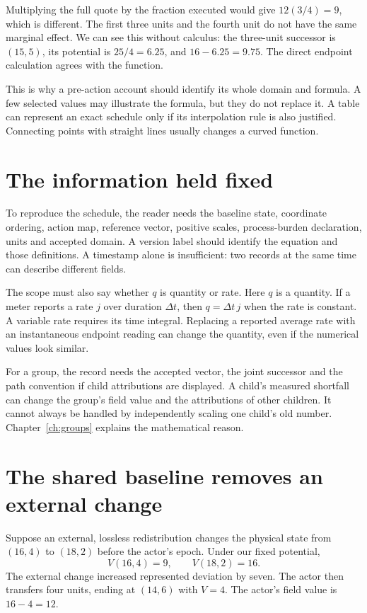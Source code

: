 Multiplying the full quote by the fraction executed would give $12(3/4)=9$, which is different. The first three units and the fourth unit do not have the same marginal effect. We can see this without calculus: the three-unit successor is $(15,5)$, its potential is $25/4=6.25$, and $16-6.25=9.75$. The direct endpoint calculation agrees with the function.

This is why a pre-action account should identify its whole domain and formula. A few selected values may illustrate the formula, but they do not replace it. A table can represent an exact schedule only if its interpolation rule is also justified. Connecting points with straight lines usually changes a curved function.


\section{The information held fixed}
To reproduce the schedule, the reader needs the baseline state, coordinate ordering, action map, reference vector, positive scales, process-burden declaration, units and accepted domain. A version label should identify the equation and those definitions. A timestamp alone is insufficient: two records at the same time can describe different fields.

The scope must also say whether $q$ is quantity or rate. Here $q$ is a quantity. If a meter reports a rate $j$ over duration $\Delta t$, then $q=\Delta t\,j$ when the rate is constant. A variable rate requires its time integral. Replacing a reported average rate with an instantaneous endpoint reading can change the quantity, even if the numerical values look similar.

For a group, the record needs the accepted vector, the joint successor and the path convention if child attributions are displayed. A child's measured shortfall can change the group's field value and the attributions of other children. It cannot always be handled by independently scaling one child's old number. Chapter~\ref{ch:groups} explains the mathematical reason.

\section{The shared baseline removes an external change}
Suppose an external, lossless redistribution changes the physical state from $(16,4)$ to $(18,2)$ before the actor's epoch. Under our fixed potential,
\[
 V(16,4)=9,\qquad V(18,2)=16.
\]
The external change increased represented deviation by seven. The actor then transfers four units, ending at $(14,6)$ with $V=4$. The actor's field value is $16-4=12$.

